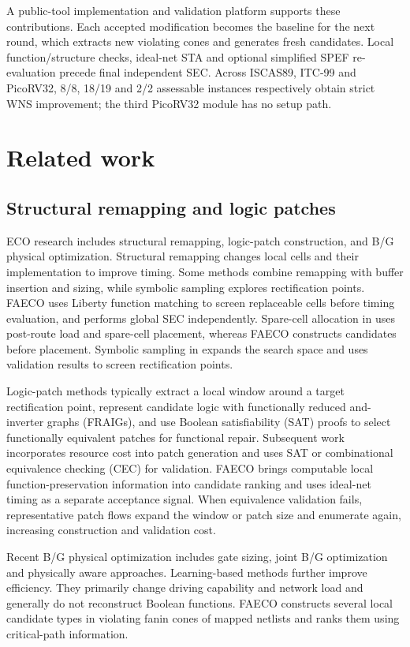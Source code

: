\documentclass[preprint,12pt]{elsarticle}
\begin{document}
A public-tool implementation and validation platform supports these contributions. Each accepted modification becomes the baseline for the next round, which extracts new violating cones and generates fresh candidates. Local function/structure checks, ideal-net STA and optional simplified SPEF re-evaluation precede final independent SEC. Across ISCAS89, ITC-99 and PicoRV32, 8/8, 18/19 and 2/2 assessable instances respectively obtain strict WNS improvement; the third PicoRV32 module has no setup path.

\section{Related work}
\subsection{Structural remapping and logic patches}
ECO research includes structural remapping, logic-patch construction, and B/G physical optimization. Structural remapping changes local cells and their implementation to improve timing. Some methods combine remapping with buffer insertion and sizing\cite{ho2010eco}, while symbolic sampling explores rectification points\cite{kravets2019symbolic}. FAECO uses Liberty function matching to screen replaceable cells before timing evaluation, and performs global SEC independently. Spare-cell allocation in\cite{ho2010eco} uses post-route load and spare-cell placement, whereas FAECO constructs candidates before placement. Symbolic sampling in\cite{kravets2019symbolic} expands the search space and uses validation results to screen rectification points.

Logic-patch methods typically extract a local window around a target rectification point, represent candidate logic with functionally reduced and-inverter graphs (FRAIGs), and use Boolean satisfiability (SAT) proofs to select functionally equivalent patches for functional repair\cite{jiang2010fraig,jiang2016resource}. Subsequent work incorporates resource cost into patch generation and uses SAT or combinational equivalence checking (CEC) for validation\cite{jiang2016resource,zhong2024stp}. FAECO brings computable local function-preservation information into candidate ranking and uses ideal-net timing as a separate acceptance signal. When equivalence validation fails, representative patch flows expand the window or patch size and enumerate again\cite{zhuo2018patch}, increasing construction and validation cost.

Recent B/G physical optimization includes gate sizing, joint B/G optimization and physically aware approaches\cite{liu2021rlsizer,huang2025phys,chen2024aito,zhang2025buffalo}. Learning-based methods further improve efficiency\cite{chen2024aito,zhang2025buffalo}. They primarily change driving capability and network load and generally do not reconstruct Boolean functions. FAECO constructs several local candidate types in violating fanin cones of mapped netlists and ranks them using critical-path information.
\end{document}
